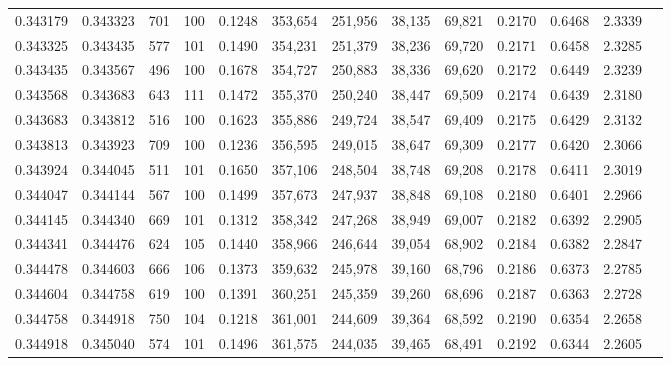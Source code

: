 \begin{tabular}{rrrrrrrrrrrrr}
0.343179 & 0.343323 &   701 & 100 &                                     0.1248 & 353,654 & 251,956 &  38,135 &  69,821 & 0.2170 & 0.6468 & 2.3339 \\
0.343325 & 0.343435 &   577 & 101 &                                     0.1490 & 354,231 & 251,379 &  38,236 &  69,720 & 0.2171 & 0.6458 & 2.3285 \\
0.343435 & 0.343567 &   496 & 100 &                                     0.1678 & 354,727 & 250,883 &  38,336 &  69,620 & 0.2172 & 0.6449 & 2.3239 \\
0.343568 & 0.343683 &   643 & 111 &                                     0.1472 & 355,370 & 250,240 &  38,447 &  69,509 & 0.2174 & 0.6439 & 2.3180 \\
0.343683 & 0.343812 &   516 & 100 &                                     0.1623 & 355,886 & 249,724 &  38,547 &  69,409 & 0.2175 & 0.6429 & 2.3132 \\
0.343813 & 0.343923 &   709 & 100 &                                     0.1236 & 356,595 & 249,015 &  38,647 &  69,309 & 0.2177 & 0.6420 & 2.3066 \\
0.343924 & 0.344045 &   511 & 101 &                                     0.1650 & 357,106 & 248,504 &  38,748 &  69,208 & 0.2178 & 0.6411 & 2.3019 \\
0.344047 & 0.344144 &   567 & 100 &                                     0.1499 & 357,673 & 247,937 &  38,848 &  69,108 & 0.2180 & 0.6401 & 2.2966 \\
0.344145 & 0.344340 &   669 & 101 &                                     0.1312 & 358,342 & 247,268 &  38,949 &  69,007 & 0.2182 & 0.6392 & 2.2905 \\
0.344341 & 0.344476 &   624 & 105 &                                     0.1440 & 358,966 & 246,644 &  39,054 &  68,902 & 0.2184 & 0.6382 & 2.2847 \\
0.344478 & 0.344603 &   666 & 106 &                                     0.1373 & 359,632 & 245,978 &  39,160 &  68,796 & 0.2186 & 0.6373 & 2.2785 \\
0.344604 & 0.344758 &   619 & 100 &                                     0.1391 & 360,251 & 245,359 &  39,260 &  68,696 & 0.2187 & 0.6363 & 2.2728 \\
0.344758 & 0.344918 &   750 & 104 &                                     0.1218 & 361,001 & 244,609 &  39,364 &  68,592 & 0.2190 & 0.6354 & 2.2658 \\
0.344918 & 0.345040 &   574 & 101 &                                     0.1496 & 361,575 & 244,035 &  39,465 &  68,491 & 0.2192 & 0.6344 & 2.2605 \\

\end{tabular}

